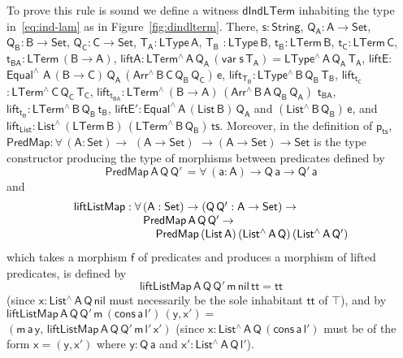 \documentclass[sigplan,10pt,anonymous,review]{acmart}
\begin{document}
To prove this rule is sound we define a witness $\mathsf{dIndLTerm}$
inhabiting the type in~\eqref{eq:ind-lam} as in
Figure~\ref{fig:dindlterm}. There, $\mathsf{s : String}$, $\mathsf{Q_A
  : A \to Set}$, $\mathsf{Q_B : B \to Set}$, $\mathsf{Q_C : C \to
  Set}$, $\mathsf{T_A : LType\,A}$, $\mathsf{T_B}$ $\mathsf{:
  LType\,B}$, $\mathsf{t_B : LTerm\,B}$, $\mathsf{t_C : LTerm\,C}$,
$\mathsf{t_{BA} : LTerm\,(B \to A)}$, $\mathsf{liftA :
  LTerm^{\wedge}\, A\, Q_A\, (var\;s\,T_A) =
  LType^{\wedge}\,A\,Q_A\,T_A}$, $\mathsf{liftE :}$
$\mathsf{Equal^{\wedge}}$ $\mathsf{A\, (B \to C)\, Q_A\, (Arr^{\wedge}
  \, B\, C\, Q_B \, Q_C) \, e}$, $\mathsf{lift_{T_B}: LType^{\wedge}
  \, B\, Q_B\, T_B}$, $\mathsf{lift_{t_C}}$ $\mathsf{: LTerm^{\wedge}
  \, C\, Q_C\, T_C}$, $\mathsf{lift_{t_{BA}}: LTerm^{\wedge} \, (B \to
  A)\, (Arr^{\wedge} \, B\, A\, Q_B \, Q_A)}$ $\mathsf{t_{BA}}$,
$\mathsf{lift_{t_B}: LTerm^{\wedge} \, B\, Q_B\, t_B}$,
$\mathsf{liftE' : Equal^{\wedge}\, A\, (List\,B)\, Q_A}$ and
$\mathsf{(List^{\wedge}\, B\, Q_B)\, e}$, and $\mathsf{lift_{List}:
  List^{\wedge} \, (LTerm\, B) \, (LTerm^{\wedge}\, B\, Q_B) \, ts}$.
Moreover, in the definition of $\mathsf{p_{ts}}$, $\mathsf{PredMap :
  \forall\, (A : Set) \to}$ $\mathsf{(A \to Set)}$ $\mathsf{\to (A \to
  Set) \to Set }$ is the type constructor producing the type of
morphisms between predicates defined by
\[\mathsf{PredMap \,A\, Q\,Q'\,
  = \forall\, (a : A) \to Q\,a \to Q'\,a}\] and
\[\begin{array}{l}
\mathsf{liftListMap : \forall\, (A : Set) \to (Q \, Q' : A \to Set)
  \to}\\\
\hspace*{0.8in}\mathsf{PredMap\,A\,Q\,Q' \to}\\
\hspace*{1in}\mathsf{PredMap\,(List\,A)
  \,(List^{\wedge}\, A\, Q)\, (List^{\wedge}\, A\, Q')}
\end{array}\]
which takes a morphism $\mathsf{f}$ of predicates and produces a
morphism of lifted predicates, is defined by
\[\mathsf{liftListMap\, A\, Q\, Q'\, m\, nil\, tt = tt}\]
(since $\mathsf{x : List^{\wedge}\,
  A\, Q\, nil}$ must necessarily be the sole inhabitant $\mathsf{tt}$
of $\mathsf{\top}$), and by $\mathsf{liftListMap\, A\, Q\, Q'\, m\,
  (cons\, a\, l')\, (y, x') =}$\\ $\mathsf{ (m\,a\,y, \,liftListMap\, A\,
  Q\, Q'\, m\, l'\, x')}$ (since $\mathsf{x : List^{\wedge}\, A\,
  Q\, (cons\, a\, l')}$ must be of the form $\mathsf{x = (y, x')}$
where $\mathsf{y : Q\,a}$ and $\mathsf{x' : List^{\wedge}\, A\, Q\,
  l'}$).
\end{document}
